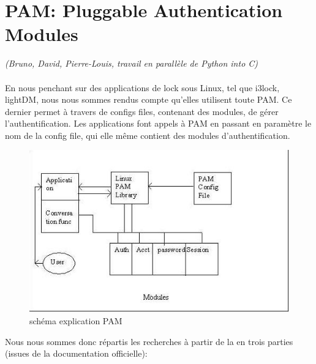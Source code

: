\documentclass{article}
\begin{document}
  \section{PAM: Pluggable Authentication Modules} \emph{(Bruno, David,
  Pierre-Louis, travail en parallèle de Python into C)}\\ \\
En nous penchant sur des applications de lock sous Linux, tel que i3lock,
lightDM, nous nous sommes rendus compte qu’elles utilisent toute PAM.
Ce dernier permet à travers de configs files, contenant des modules, de
gérer l’authentification. Les applications font appels à PAM en passant en
paramètre le nom de la config file, qui elle même contient des modules
d’authentification.

  \begin{figure}[h]
    \begin{center}
    \includegraphics[width=0.8\linewidth]{pam}
    \caption{schéma explication PAM}
  \end{center}
  \end{figure}
\newpage
  Nous nous sommes donc répartis les recherches à partir de la en trois parties
  (issues de la documentation officielle):
\end{document}

